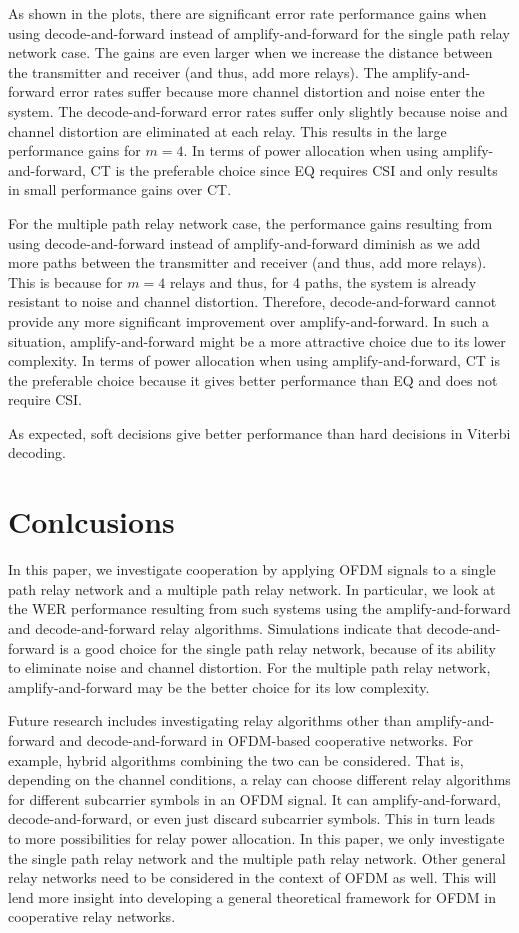 \documentclass[conference]{IEEEtran}
\begin{document}
As shown in the plots, there are significant error rate
performance gains when using decode-and-forward instead of
amplify-and-forward for the single path relay network case.  The
gains are even larger when we increase the distance between the
transmitter and receiver (and thus, add more relays).  The
amplify-and-forward error rates suffer because more channel
distortion and noise enter the system.  The decode-and-forward
error rates suffer only slightly because noise and channel
distortion are eliminated at each relay.  This results in the
large performance gains for $m=4$.  In terms of power allocation
when using amplify-and-forward, CT is the preferable choice since
EQ requires CSI and only results in small performance gains over
CT.

For the multiple path relay network case, the performance gains
resulting from using decode-and-forward instead of
amplify-and-forward diminish as we add more paths between the
transmitter and receiver (and thus, add more relays). This is
because for $m=4$ relays and thus, for 4 paths, the system is
already resistant to noise and channel distortion.  Therefore,
decode-and-forward cannot provide any more significant improvement
over amplify-and-forward.  In such a situation,
amplify-and-forward might be a more attractive choice due to its
lower complexity.  In terms of power allocation when using
amplify-and-forward, CT is the preferable choice because it gives
better performance than EQ and does not require CSI.

As expected, soft decisions give better performance than hard
decisions in Viterbi decoding.


\section{Conlcusions}
\label{sec:conclusions}

In this paper, we investigate cooperation by applying OFDM signals
to a single path relay network and a multiple path relay network.
In particular, we look at the WER performance resulting from such
systems using the amplify-and-forward and decode-and-forward relay
algorithms.  Simulations indicate that decode-and-forward is a
good choice for the single path relay network, because of its
ability to eliminate noise and channel distortion.  For the
multiple path relay network, amplify-and-forward may be the better
choice for its low complexity.

Future research includes investigating relay algorithms other than amplify-and-forward and decode-and-forward in OFDM-based cooperative networks.  For example, hybrid algorithms combining the two can be considered.  That is, depending on the channel conditions, a relay can choose different relay algorithms for different subcarrier symbols in an OFDM signal.  It can amplify-and-forward, decode-and-forward, or even just discard subcarrier symbols.  This in turn leads to more possibilities for relay power allocation.  In this paper, we only investigate the single path relay network and the multiple path relay network.  Other general relay networks need to be considered in the context of OFDM as well.  This will lend more insight into developing a general theoretical framework for OFDM in cooperative relay networks.

\hspace{1cm}



\end{document}
